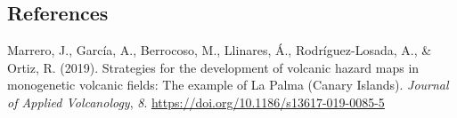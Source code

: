 \documentclass[
]{agujournal2019}
\newlength{\cslhangindent}
\newlength{\cslentryspacingunit} %
\newenvironment{CSLReferences}[2] %
 {%
  \setlength{\parindent}{0pt}
  \ifodd #1
  \let\oldpar\par
  \def\par{\hangindent=\cslhangindent\oldpar}
  \fi
  \setlength{\parskip}{#2\cslentryspacingunit}
 }%
 {}
\begin{document}
\hypertarget{references}{%
\subsection*{References}\label{references}}

\hypertarget{refs}{}
\begin{CSLReferences}{1}{0}
\vspace{1em}

\leavevmode{}%
Marrero, J., García, A., Berrocoso, M., Llinares, Á., Rodríguez-Losada,
A., \& Ortiz, R. (2019). Strategies for the development of volcanic
hazard maps in monogenetic volcanic fields: The example of {La} {Palma}
({Canary} {Islands}). \emph{Journal of Applied Volcanology}, \emph{8}.
\url{https://doi.org/10.1186/s13617-019-0085-5}

\end{CSLReferences}
\end{document}
